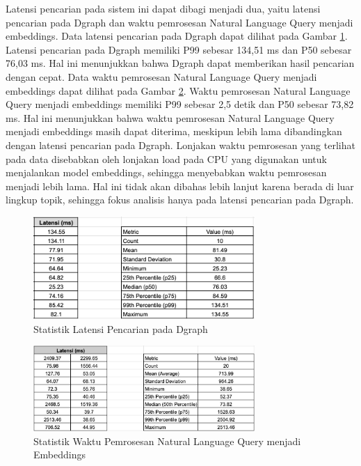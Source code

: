 
Latensi pencarian pada sistem ini dapat dibagi menjadi dua, yaitu latensi pencarian pada Dgraph dan waktu pemrosesan Natural Language Query menjadi embeddings. Data latensi pencarian pada Dgraph dapat dilihat pada Gambar \ref{image:latency-dgraph}. Latensi pencarian pada Dgraph memiliki P99 sebesar 134,51 ms dan P50 sebesar 76,03 ms. Hal ini menunjukkan bahwa Dgraph dapat memberikan hasil pencarian dengan cepat. Data waktu pemrosesan Natural Language Query menjadi embeddings dapat dilihat pada Gambar \ref{image:latency-embeddings}. Waktu pemrosesan Natural Language Query menjadi embeddings memiliki P99 sebesar 2,5 detik dan P50 sebesar 73,82 ms. Hal ini menunjukkan bahwa waktu pemrosesan Natural Language Query menjadi embeddings masih dapat diterima, meskipun lebih lama dibandingkan dengan latensi pencarian pada Dgraph. Lonjakan waktu pemrosesan yang terlihat pada data disebabkan oleh lonjakan load pada CPU yang digunakan untuk menjalankan model embeddings, sehingga menyebabkan waktu pemrosesan menjadi lebih lama. Hal ini tidak akan dibahas lebih lanjut karena berada di luar lingkup topik, sehingga fokus analisis hanya pada latensi pencarian pada Dgraph.

\begin{figure}[ht]
	\centering
	\includegraphics[width=0.75\textwidth]{resources/chapter-4/data-latensi.png}
	\caption{Statistik Latensi Pencarian pada Dgraph}
	\label{image:latency-dgraph}
\end{figure}

\begin{figure}[ht]
	\centering
	\includegraphics[width=0.75\textwidth]{resources/chapter-4/data-latensi-embeddings.png}
	\caption{Statistik Waktu Pemrosesan Natural Language Query menjadi Embeddings}
	\label{image:latency-embeddings}
\end{figure}

